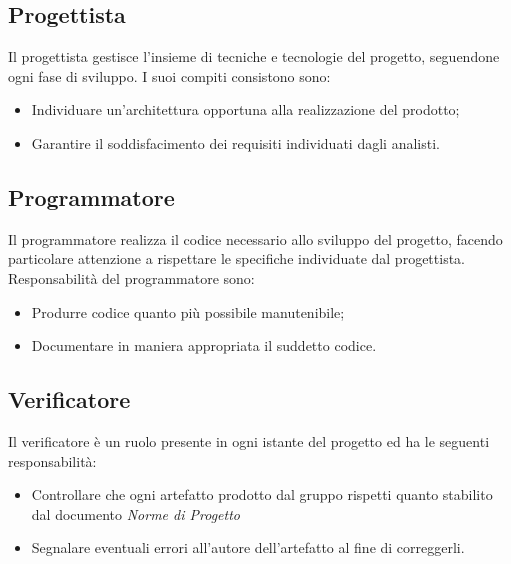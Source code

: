 \documentclass{article}
\begin{document}
\subsection{Progettista}
Il progettista gestisce l'insieme di tecniche e tecnologie del progetto, seguendone ogni fase di sviluppo. I suoi compiti consistono sono:
\begin{itemize}
    \item Individuare un'architettura opportuna alla realizzazione del prodotto;
    \item Garantire il soddisfacimento dei requisiti individuati dagli analisti.
\end{itemize}

\subsection{Programmatore}
Il programmatore realizza il codice necessario allo sviluppo del progetto, facendo particolare attenzione a rispettare le specifiche individuate dal progettista. Responsabilità del programmatore sono:
\begin{itemize}
    \item Produrre codice quanto più possibile manutenibile;
    \item Documentare in maniera appropriata il suddetto codice.
\end{itemize}

\subsection{Verificatore}
Il verificatore è un ruolo presente in ogni istante del progetto ed ha le seguenti responsabilità:
\begin{itemize}
    \item Controllare che ogni artefatto prodotto dal gruppo  rispetti quanto stabilito dal documento \textit{Norme di Progetto}
    \item Segnalare eventuali errori all'autore dell'artefatto al fine di correggerli.
\end{itemize}
\end{document}
